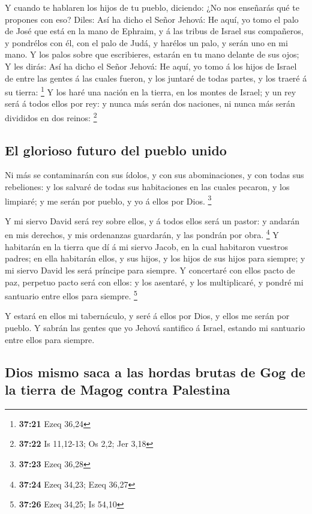  Y cuando te hablaren los hijos de tu pueblo, diciendo: ¿No
nos enseñarás qué te propones con eso?  Diles: Así ha dicho
el Señor Jehová: He aquí, yo tomo el palo de José que está en la mano de
Ephraim, y á las tribus de Israel sus compañeros, y pondrélos con él,
con el palo de Judá, y harélos un palo, y serán uno en mi mano.
 Y los palos sobre que escribieres, estarán en tu mano
delante de sus ojos;  Y les dirás: Así ha dicho el Señor
Jehová: He aquí, yo tomo á los hijos de Israel de entre las gentes á las
cuales fueron, y los juntaré de todas partes, y los traeré á su tierra:
\footnote{\textbf{37:21} Ezeq 36,24}  Y los haré una nación
en la tierra, en los montes de Israel; y un rey será á todos ellos por
rey: y nunca más serán dos naciones, ni nunca más serán divididos en dos
reinos: \footnote{\textbf{37:22} Is 11,12-13; Os 2,2; Jer 3,18}

\hypertarget{el-glorioso-futuro-del-pueblo-unido}{%
\subsection{El glorioso futuro del pueblo
unido}\label{el-glorioso-futuro-del-pueblo-unido}}

 Ni más se contaminarán con sus ídolos, y con sus
abominaciones, y con todas sus rebeliones: y los salvaré de todas sus
habitaciones en las cuales pecaron, y los limpiaré; y me serán por
pueblo, y yo á ellos por Dios. \footnote{\textbf{37:23} Ezeq 36,28}

 Y mi siervo David será rey sobre ellos, y á todos ellos
será un pastor: y andarán en mis derechos, y mis ordenanzas guardarán, y
las pondrán por obra. \footnote{\textbf{37:24} Ezeq 34,23; Ezeq 36,27}
 Y habitarán en la tierra que dí á mi siervo Jacob, en la
cual habitaron vuestros padres; en ella habitarán ellos, y sus hijos, y
los hijos de sus hijos para siempre; y mi siervo David les será príncipe
para siempre.  Y concertaré con ellos pacto de paz,
perpetuo pacto será con ellos: y los asentaré, y los multiplicaré, y
pondré mi santuario entre ellos para siempre. \footnote{\textbf{37:26}
  Ezeq 34,25; Is 54,10}

 Y estará en ellos mi tabernáculo, y seré á ellos por Dios,
y ellos me serán por pueblo.  Y sabrán las gentes que yo
Jehová santifico á Israel, estando mi santuario entre ellos para
siempre.

\hypertarget{dios-mismo-saca-a-las-hordas-brutas-de-gog-de-la-tierra-de-magog-contra-palestina}{%
\subsection{Dios mismo saca a las hordas brutas de Gog de la tierra de
Magog contra
Palestina}\label{dios-mismo-saca-a-las-hordas-brutas-de-gog-de-la-tierra-de-magog-contra-palestina}}

